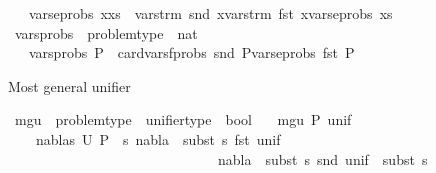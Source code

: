 \begin{isabellebody}
\ \ \ {\isachardoublequoteopen}vars{\isacharunderscore}{\kern0pt}eprobs\ {\isacharparenleft}{\kern0pt}x{\isacharhash}{\kern0pt}xs{\isacharparenright}{\kern0pt}\ {\isacharequal}{\kern0pt}\ {\isacharparenleft}{\kern0pt}vars{\isacharunderscore}{\kern0pt}trm\ {\isacharparenleft}{\kern0pt}snd\ x{\isacharparenright}{\kern0pt}{\isacharparenright}{\kern0pt}{\isasymunion}{\isacharparenleft}{\kern0pt}vars{\isacharunderscore}{\kern0pt}trm\ {\isacharparenleft}{\kern0pt}fst\ x{\isacharparenright}{\kern0pt}{\isacharparenright}{\kern0pt}{\isasymunion}{\isacharparenleft}{\kern0pt}vars{\isacharunderscore}{\kern0pt}eprobs\ xs{\isacharparenright}{\kern0pt}{\isachardoublequoteclose}\isanewline
\isanewline
{}\isamarkupfalse%
\ vars{\isacharunderscore}{\kern0pt}probs\ {\isacharcolon}{\kern0pt}{\isacharcolon}{\kern0pt}\ {\isachardoublequoteopen}problem{\isacharunderscore}{\kern0pt}type\ {\isasymRightarrow}\ nat{\isachardoublequoteclose}\isanewline
\ \ \ {\isachardoublequoteopen}vars{\isacharunderscore}{\kern0pt}probs\ P\ {\isasymequiv}\ card{\isacharparenleft}{\kern0pt}{\isacharparenleft}{\kern0pt}vars{\isacharunderscore}{\kern0pt}fprobs\ {\isacharparenleft}{\kern0pt}snd\ P{\isacharparenright}{\kern0pt}{\isacharparenright}{\kern0pt}{\isasymunion}{\isacharparenleft}{\kern0pt}vars{\isacharunderscore}{\kern0pt}eprobs\ {\isacharparenleft}{\kern0pt}fst\ P{\isacharparenright}{\kern0pt}{\isacharparenright}{\kern0pt}{\isacharparenright}{\kern0pt}{\isachardoublequoteclose}%
\begin{isamarkuptext}%
Most general unifier%
\end{isamarkuptext}\isamarkuptrue%
\isamarkupfalse%
\ mgu\ {\isacharcolon}{\kern0pt}{\isacharcolon}{\kern0pt}\ {\isachardoublequoteopen}problem{\isacharunderscore}{\kern0pt}type\ {\isasymRightarrow}\ unifier{\isacharunderscore}{\kern0pt}type\ {\isasymRightarrow}\ bool{\isachardoublequoteclose}\isanewline
\ \ \ {\isachardoublequoteopen}mgu\ P\ unif\ {\isasymequiv}\ \isanewline
\ \ \ {\isasymforall}\ {\isacharparenleft}{\kern0pt}nabla{\isacharcomma}{\kern0pt}s{}{\isacharparenright}{\kern0pt}{\isasymin}\ U\ P{\isachardot}{\kern0pt}\ {\isacharparenleft}{\kern0pt}{\isasymexists}\ s{}{\isachardot}{\kern0pt}\ {\isacharparenleft}{\kern0pt}nabla\ {\isasymTurnstile}\ {\isacharparenleft}{\kern0pt}subst\ s{}{\isacharparenright}{\kern0pt}\ {\isacharparenleft}{\kern0pt}fst\ unif{\isacharparenright}{\kern0pt}{\isacharparenright}{\kern0pt}\ {\isasymand}\ \isanewline
\ \ \ \ \ \ \ \ \ \ \ \ \ \ \ \ \ \ \ \ \ \ \ \ \ \ \ \ \ \ {\isacharparenleft}{\kern0pt}nabla\ {\isasymTurnstile}\ subst\ {\isacharparenleft}{\kern0pt}s{}\ {\isasymbullet}{\isacharparenleft}{\kern0pt}snd\ unif{\isacharparenright}{\kern0pt}{\isacharparenright}{\kern0pt}\ {\isasymapprox}\ subst\ s{}{\isacharparenright}{\kern0pt}{\isacharparenright}{\kern0pt}{\isachardoublequoteclose}%

\end{isabellebody}
